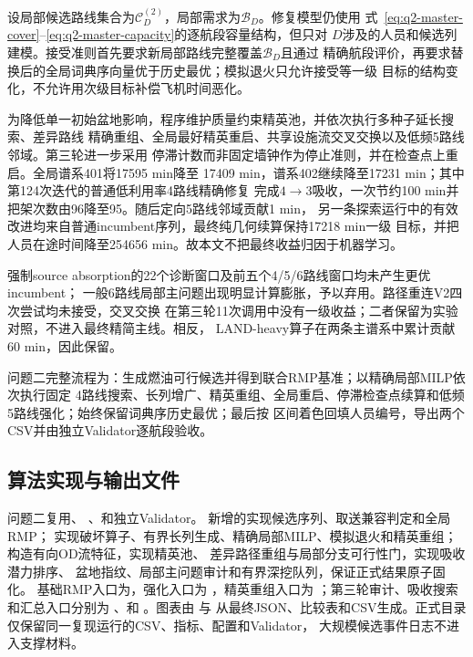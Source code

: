\documentclass[UTF8,a4paper,zihao=5]{ctexart}
\begin{document}
设局部候选路线集合为$\mathcal C_D^{(2)}$，局部需求为$\mathcal B_D$。修复模型仍使用
式~\eqref{eq:q2-master-cover}--\eqref{eq:q2-master-capacity}的逐航段容量结构，但只对
$D$涉及的人员和候选列建模。接受准则首先要求新局部路线完整覆盖$\mathcal B_D$且通过
精确航段评价，再要求替换后的全局词典序向量优于历史最优；模拟退火只允许接受等一级
目标的结构变化，不允许用次级目标补偿飞机时间恶化。

为降低单一初始盆地影响，程序维护质量约束精英池，并依次执行多种子延长搜索、差异路线
精确重组、全局最好精英重启、共享设施流交叉交换以及低频5路线邻域。第三轮进一步采用
停滞计数而非固定墙钟作为停止准则，并在检查点上重启。全局谱系401将17595 min降至
17409 min，谱系402继续降至17231 min；其中第124次迭代的普通低利用率4路线精确修复
完成$4\to3$吸收，一次节约100 min并把架次数由96降至95。随后定向5路线邻域贡献1 min，
另一条探索运行中的有效改进均来自普通incumbent序列，最终纯几何续算保持17218 min一级
目标，并把人员在途时间降至254656 min。故本文不把最终收益归因于机器学习。

强制source absorption的22个诊断窗口及前五个4/5/6路线窗口均未产生更优incumbent；
一般6路线局部主问题出现明显计算膨胀，予以弃用。路径重连V2四次尝试均未接受，交叉交换
在第三轮11次调用中没有一级收益；二者保留为实验对照，不进入最终精简主线。相反，
LAND-heavy算子在两条主谱系中累计贡献60 min，因此保留。

问题二完整流程为：生成燃油可行候选并得到联合RMP基准；以精确局部MILP依次执行固定
4路线搜索、长列增广、精英重组、全局重启、停滞检查点续算和低频5路线强化；始终保留词典序历史最优；最后按
区间着色回填人员编号，导出两个CSV并由独立Validator逐航段验收。

\subsection{算法实现与输出文件}

问题二复用、
、和独立Validator。
新增的实现候选序列、取送兼容判定和全局RMP；
实现破坏算子、有界长列生成、精确局部MILP、模拟退火和精英重组；
构造有向OD流特征，实现精英池、
差异路径重组与局部分支可行性门，实现吸收潜力排序、
盆地指纹、局部主问题审计和有界深挖队列，保证正式结果原子固化。
基础RMP入口为，强化入口为
，精英重组入口为
；第三轮审计、吸收搜索和汇总入口分别为
、和
。图表由
与
从最终JSON、比较表和CSV生成。正式目录仅保留同一复现运行的CSV、指标、配置和Validator，
大规模候选事件日志不进入支撑材料。
\end{document}
